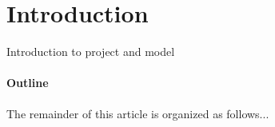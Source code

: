 \section{Introduction} 
  \label{intro}

  Introduction to project and model

  \paragraph{Outline}
    The remainder of this article is organized as follows...